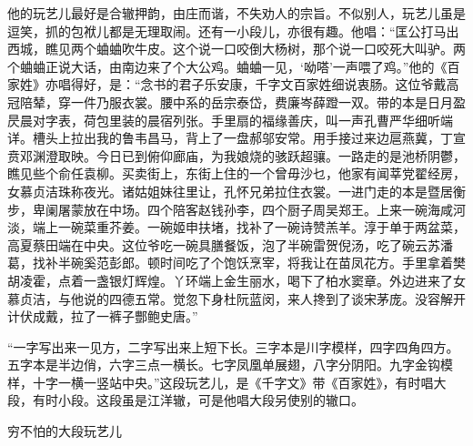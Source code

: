 \documentclass[12pt,UTF8]{ctexbook}
\begin{document}
他的玩艺儿最好是合辙押韵，由庄而谐，不失劝人的宗旨。不似别人，玩艺儿虽是逗笑，抓的包袱儿都是无理取闹。还有一小段儿，亦很有趣。他唱：“匡公打马出西城，瞧见两个蛐蛐吹牛皮。这个说一口咬倒大杨树，那个说一口咬死大叫驴。两个蛐蛐正说大话，由南边来了个大公鸡。蛐蛐一见，‘呦嗒’一声喂了鸡。”他的《百家姓》亦唱得好，是：“念书的君子乐安康，千字文百家姓细说衷肠。这位爷戴高冠陪辇，穿一件乃服衣裳。腰中系的岳宗泰岱，费廉岑薛蹬一双。带的本是日月盈昃晨对字表，荷包里装的晨宿列张。手里扇的福缘善庆，叫一声孔曹严华细听端详。槽头上拉出我的鲁韦昌马，背上了一盘郝邬安常。用手接过来边扈燕冀，丁宣贲邓渊澄取映。今日已到俯仰廊庙，为我娘烧的骇跃超骧。一路走的是池桥阴鬱，瞧见些个俞任袁柳。买卖街上，东街上住的一个曾毋沙乜，他家有闻莘党翟经房，女慕贞洁珠称夜光。诸姑姐妹往里让，孔怀兄弟拉住衣裳。一进门走的本是暨居衡步，卑阑屠蒙放在中场。四个陪客赵钱孙李，四个厨子周吴郑王。上来一碗海咸河淡，端上一碗菜重芥姜。一碗姬申扶堵，找补了一碗诗赞羔羊。淳于单于两盆菜，高夏蔡田端在中央。这位爷吃一碗具膳餐饭，泡了半碗雷贺倪汤，吃了碗云苏潘葛，找补半碗奚范彭郎。顿时间吃了个饱饫烹宰，将我让在苗凤花方。手里拿着樊胡凌霍，点着一盏银灯辉煌。丫环端上金生丽水，喝下了柏水窦章。外边进来了女慕贞洁，与他说的四德五常。觉忽下身杜阮蓝闵，来人搀到了谈宋茅庞。没容解开计伏成戴，拉了一裤子酆鲍史唐。”

“一字写出来一见方，二字写出来上短下长。三字本是川字模样，四字四角四方。五字本是半边俏，六字三点一横长。七字凤凰单展翅，八字分阴阳。九字金钩模样，十字一横一竖站中央。”这段玩艺儿，是《千字文》带《百家姓》，有时唱大段，有时小段。这段虽是江洋辙，可是他唱大段另使别的辙口。





穷不怕的大段玩艺儿
\end{document}
